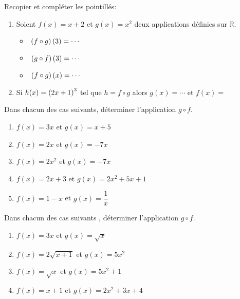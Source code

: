 



	\begin{exercice}
Recopier et compléter  les pointillés:
\begin{enumerate}
\item Soient  $ f(x)=x+2$ et $ g(x)=x^2$ deux applications définies sur $ \mathbb{R} $.
\begin{itemize}
\item
 $\; \left(f \circ g\right)(3)=\cdots$
\item
$\;\left(g \circ f\right)(3) =\cdots\hspace*{1cm}$ 
\item 
$\;\left(f \circ g\right)(x) =\cdots$
\end{itemize}
\item    Si  $ h(x)=\left(2x+1\right)^3 $ \; tel que $ h=f\circ g $ alors \;  $ g(x)= \cdots $ \; et $ f(x)= $
\end{enumerate}
\end{exercice}
\begin{exercice}
Dans chacun des cas suivants, déterminer l'application  $ g\circ f $.

\begin{enumerate}
\item  $ f(x)= 3x $ \; et\; $ g(x)=x+5 $


\item  $ f(x)= 2x $ \; et \; $ g(x)=-7x $


\item  $ f(x)= 2x^{2} $ \; et \; $ g(x)=-7x $


\item $ f(x)= 2x+3 $ \; et\; $ g(x)=2x^{2}+5x+1 $


\item $ f(x)= 1-x $ \;  et  \;$ g(x)=\dfrac{1}{x} $

\end{enumerate}

\end{exercice}



\begin{exercice}
 Dans chacun des cas suivants , déterminer l'application  $ g\circ f $.

\begin{enumerate}
\item  $ f(x)= 3x $ \; et \;$ g(x)=\sqrt{x} $


\item $ f(x)= 2\sqrt{x+1} $ \; et\;  $ g(x)=5x^{2} $


\item $ f(x)= \sqrt{x} $ \; et\;  $ g(x)=5x^{2}+1 $


\item $ f(x)= x+1 $\;  et  \; $ g(x)=2x^{2} +3x+4$

\end{enumerate}

\end{exercice}


